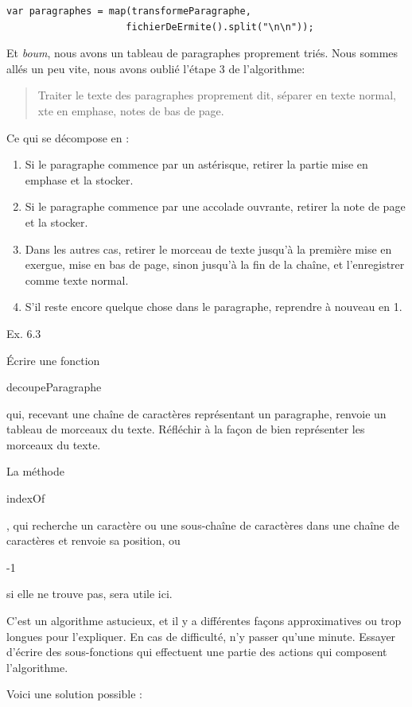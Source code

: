 \documentclass{FramateX}
\renewcommand{\texttt}[1]{\begin{sffamily}{#1}\end{sffamily}}
\begin{document}
\begin{lstlisting}
var paragraphes = map(transformeParagraphe,
                     fichierDeErmite().split("\n\n"));
\end{lstlisting}
Et \emph{boum}, nous avons un tableau de paragraphes proprement triés.
Nous sommes allés un peu vite, nous avons oublié l'étape 3 de
l'algorithme:

\begin{quote}
Traiter le texte des paragraphes proprement dit, séparer en texte
normal, xte en emphase, notes de bas de page.
\end{quote}
Ce qui se décompose en :

\begin{enumerate}
\item
  Si le paragraphe commence par un astérisque, retirer la partie mise en
  emphase et la stocker.
\item
  Si le paragraphe commence par une accolade ouvrante, retirer la note
  de page et la stocker.
\item
  Dans les autres cas, retirer le morceau de texte jusqu'à la première
  mise en exergue, mise en bas de page, sinon jusqu'à la fin de la
  chaîne, et l'enregistrer comme texte normal.
\item
  S'il reste encore quelque chose dans le paragraphe, reprendre à
  nouveau en 1.
\end{enumerate}
\begin{center}\end{center}

Ex. 6.3

Écrire une fonction \texttt{decoupeParagraphe} qui, recevant une chaîne
de caractères représentant un paragraphe, renvoie un tableau de morceaux
du texte. Réfléchir à la façon de bien représenter les morceaux du
texte.

La méthode \texttt{indexOf}, qui recherche un caractère ou une
sous-chaîne de caractères dans une chaîne de caractères et renvoie sa
position, ou \texttt{-1} si elle ne trouve pas, sera utile ici.

C'est un algorithme astucieux, et il y a différentes façons
approximatives ou trop longues pour l'expliquer. En cas de difficulté,
n'y passer qu'une minute. Essayer d'écrire des sous-fonctions qui
effectuent une partie des actions qui composent l'algorithme.

Voici une solution possible :
\end{document}
